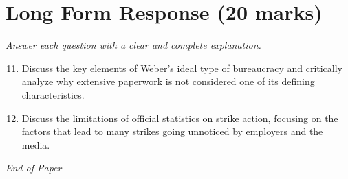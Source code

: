 \documentclass[12pt]{article}
\begin{document}
\section*{Long Form Response (20 marks)}
\textit{Answer each question with a clear and complete explanation.}
\begin{enumerate}[label=\arabic*.]
\setcounter{enumi}{10}
\item Discuss the key elements of Weber's ideal type of bureaucracy and critically analyze why extensive paperwork is not considered one of its defining characteristics.
\item Discuss the limitations of official statistics on strike action, focusing on the factors that lead to many strikes going unnoticed by employers and the media.
\end{enumerate}

\vfill
\noindent\textit{End of Paper}
\end{document}
